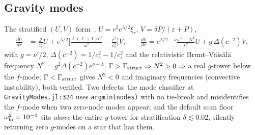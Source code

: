 \documentclass[aps,prd,preprint,amsmath,amssymb,nofootinbib,longbibliography]{revtex4-2}
\newcommand{\cs}{c_s}
\begin{document}
\subsection{Gravity modes}
The stratified $(U,V)$ form~\cite{Jaikumar2021,GaertigKokkotas2009}, $U = r^2e^{\lambda/2}\xi_r$,
$V = \delta P/(\varepsilon+P)$,
\begin{align}
\frac{dU}{dr} &= \frac{g}{\cs^2}U + e^{\lambda/2}\Big[\frac{\ell(\ell+1)e^{\nu}}{\omega^2} - \frac{r^2}{\cs^2}\Big]V,\qquad
\frac{dV}{dr} = e^{\lambda/2-\nu}\frac{\omega^2 - N^2}{r^2}U + g\,\Delta(c^{-2})V,
\end{align}
with $g = \nu'/2$, $\Delta(c^{-2}) = 1/c_e^2 - 1/\cs^2$ and the relativistic Brunt--V\"ais\"al\"a
frequency $N^2 = g^2\Delta(c^{-2})e^{\nu-\lambda}$. $\Gamma > \Gamma_{\rm struct} \Rightarrow
N^2 > 0 \Rightarrow$ a real $g$-tower below the $f$-mode; $\Gamma < \Gamma_{\rm struct}$ gives
$N^2<0$ and imaginary frequencies (convective instability), both verified. Two defects: the
mode classifier at \texttt{GravityModes.jl:324} uses \texttt{argmin(nodes)} with no tie-break and
misidentifies the $f$-mode when two zero-node modes appear; and the default scan floor
$\omega^2_{\rm lo} = 10^{-4}$ sits \emph{above} the entire $g$-tower for stratification
$\delta \lesssim 0.02$, silently returning zero $g$-modes on a star that has them.
\end{document}
